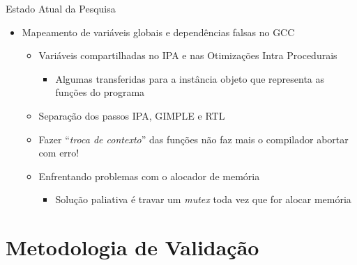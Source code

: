\begin{frame}{Estado Atual da Pesquisa}
    \begin{itemize}
        \item Mapeamento de variáveis globais e dependências falsas no GCC
            \begin{itemize}
                \item Variáveis compartilhadas no IPA e nas Otimizações Intra Procedurais
                \begin{itemize}
                    \item Algumas transferidas para a instância objeto que representa as funções do programa
                \end{itemize}
                \item Separação dos passos IPA, GIMPLE e RTL
                \item Fazer ``\textit{troca de contexto}'' das funções não faz mais o compilador abortar com erro!
                \item Enfrentando problemas com o alocador de memória
                \begin{itemize}
                    \item Solução paliativa é travar um \textit{mutex} toda vez que for alocar memória
                \end{itemize}
    \end{itemize}
\end{itemize}
\end{frame}

\section{Metodologia de Validação}


